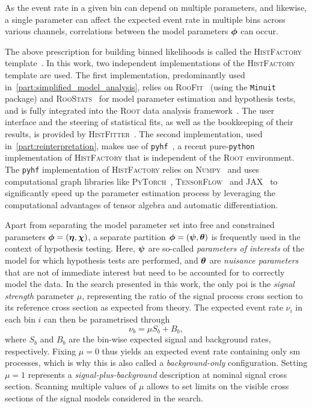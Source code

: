 As the event rate in a given bin can depend on multiple parameters, and likewise, a single parameter can affect the expected event rate in multiple bins across various channels, correlations between the model parameters $\makemebold{\phi}$ can occur.

The above prescription for building binned likelihoods is called the \textsc{HistFactory} template~\cite{Cranmer:1456844}. In this work, two independent implementations of the \textsc{HistFactory} template are used.
The first implementation, predominantly used in~\cref{part:simplified_model_analysis}, relies on \textsc{RooFit}~\cite{RooFit:2003ir} (using the \texttt{Minuit}~\cite{James:310399} package) and \textsc{RooStats}~\cite{RooStats:2010pm} for model parameter estimation and hypothesis tests, and is fully integrated into the \textsc{Root} data analysis framework~\cite{ROOT:1997pa,ROOT-2}. The user interface and the steering of statistical fits, as well as the bookkeeping of their results, is provided by \textsc{HistFitter}~\cite{HistFitter:2014wma}.
The second implementation, used in~\cref{part:reinterpretation}, makes use of \texttt{pyhf}~\cite{pyhf_joss,pyhf}, a recent pure-\texttt{python} implementation of \textsc{HistFactory} that is independent of the \textsc{Root} environment.
The \texttt{pyhf} implementation of \textsc{HistFactory} relies on \textsc{Numpy}~\cite{numpy} and uses computational graph libraries like \textsc{PyTorch}~\cite{pytorch}, \textsc{TensorFlow}~\cite{tensorflow2015-whitepaper} and \textsc{JAX}~\cite{jax2018github} to significantly speed up the parameter estimation process by leveraging the computational advantages of tensor algebra and automatic differentiation.
 
Apart from separating the model parameter set into free and constrained parameters $\makemebold{\phi} = (\makemebold{\eta},\makemebold{\chi})$, a separate partition $\makemebold{\phi} = (\makemebold{\psi},\makemebold{\theta})$ is frequently used in the context of hypothesis testing.
Here, $\makemebold{\psi}$ are so-called \textit{parameters of interests} of the model for which hypothesis tests are performed, and $\makemebold{\theta}$ are \textit{nuisance parameters} that are not of immediate interest but need to be accounted for to correctly model the data.
In the search presented in this work, the only \gls{poi} is the \textit{signal strength} parameter $\mu$, representing the ratio of the signal process cross section to its reference cross section as expected from theory.
The expected event rate $\nu_i$ in each bin $i$ can then be parametrised through
\begin{equation}
	\nu_b = \mu S_b + B_b,
\end{equation}
where $S_b$ and $B_b$ are the bin-wise expected signal and background rates, respectively. Fixing $\mu = 0$ thus yields an expected event rate containing only \gls{sm} processes, which is why this is also called a \textit{background-only} configuration. Setting $\mu = 1$ represents a \textit{signal-plus-background} description at nominal signal cross section. Scanning multiple values of $\mu$ allows to set limits on the visible cross sections of the signal models considered in the search. 
  
